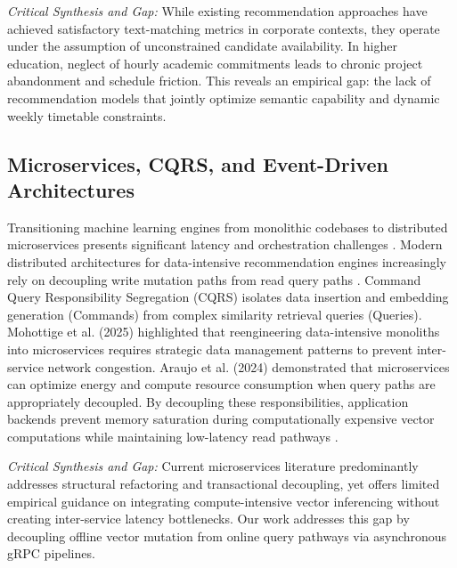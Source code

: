 \documentclass[a4paper,fleqn]{cas-dc}
\begin{document}
\medskip\noindent\textit{Critical Synthesis and Gap:} While existing recommendation approaches have achieved satisfactory text-matching metrics in corporate contexts, they operate under the assumption of unconstrained candidate availability. In higher education, neglect of hourly academic commitments leads to chronic project abandonment and schedule friction. This reveals an empirical gap: the lack of recommendation models that jointly optimize semantic capability and dynamic weekly timetable constraints.

\subsection{Microservices, CQRS, and Event-Driven Architectures}
Transitioning machine learning engines from monolithic codebases to distributed microservices presents significant latency and orchestration challenges \cite{mohottige2025}. Modern distributed architectures for data-intensive recommendation engines increasingly rely on decoupling write mutation paths from read query paths \cite{mohottige2025, araujo2024}. Command Query Responsibility Segregation (CQRS) isolates data insertion and embedding generation (Commands) from complex similarity retrieval queries (Queries). Mohottige et al. (2025) \cite{mohottige2025} highlighted that reengineering data-intensive monoliths into microservices requires strategic data management patterns to prevent inter-service network congestion. Araujo et al. (2024) \cite{araujo2024} demonstrated that microservices can optimize energy and compute resource consumption when query paths are appropriately decoupled. By decoupling these responsibilities, application backends prevent memory saturation during computationally expensive vector computations while maintaining low-latency read pathways \cite{alboqmi2025, mohottige2025, araujo2024}.

\medskip\noindent\textit{Critical Synthesis and Gap:} Current microservices literature predominantly addresses structural refactoring and transactional decoupling, yet offers limited empirical guidance on integrating compute-intensive vector inferencing without creating inter-service latency bottlenecks. Our work addresses this gap by decoupling offline vector mutation from online query pathways via asynchronous gRPC pipelines.
\end{document}
